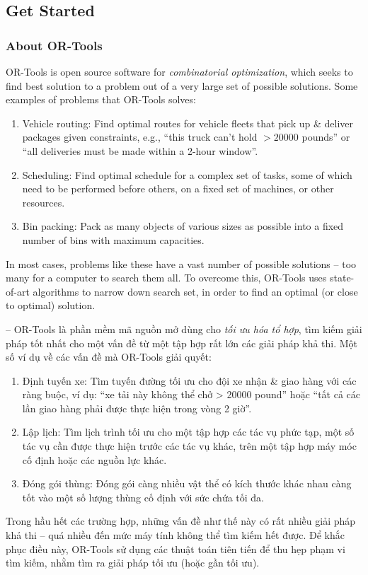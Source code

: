 \documentclass{article}
\begin{document}

\subsection{Get Started}


\subsubsection{About OR-Tools}
OR-Tools is open source software for {\it combinatorial optimization}, which seeks to find best solution to a problem out of a very large set of possible solutions. Some examples of problems that OR-Tools solves:
\begin{enumerate}
    \item Vehicle routing: Find optimal routes for vehicle fleets that pick up \& deliver packages given constraints, e.g., ``this truck can't hold $> 20000$ pounds'' or ``all deliveries must be made within a 2-hour window''.
    \item Scheduling: Find optimal schedule for a complex set of tasks, some of which need to be performed before others, on a fixed set of machines, or other resources.
    \item Bin packing: Pack as many objects of various sizes as possible into a fixed number of bins with maximum capacities.
\end{enumerate}
In most cases, problems like these have a vast number of possible solutions -- too many for a computer to search them all. To overcome this, OR-Tools uses state-of-art algorithms to narrow down search set, in order to find an optimal (or close to optimal) solution.

-- OR-Tools là phần mềm mã nguồn mở dùng cho {\it tối ưu hóa tổ hợp}, tìm kiếm giải pháp tốt nhất cho một vấn đề từ một tập hợp rất lớn các giải pháp khả thi. Một số ví dụ về các vấn đề mà OR-Tools giải quyết:
\begin{enumerate}
    \item Định tuyến xe: Tìm tuyến đường tối ưu cho đội xe nhận \& giao hàng với các ràng buộc, ví dụ: ``xe tải này không thể chở > 20000 pound'' hoặc ``tất cả các lần giao hàng phải được thực hiện trong vòng 2 giờ''.
    \item Lập lịch: Tìm lịch trình tối ưu cho một tập hợp các tác vụ phức tạp, một số tác vụ cần được thực hiện trước các tác vụ khác, trên một tập hợp máy móc cố định hoặc các nguồn lực khác.
    \item Đóng gói thùng: Đóng gói càng nhiều vật thể có kích thước khác nhau càng tốt vào một số lượng thùng cố định với sức chứa tối đa.
\end{enumerate}
Trong hầu hết các trường hợp, những vấn đề như thế này có rất nhiều giải pháp khả thi -- quá nhiều đến mức máy tính không thể tìm kiếm hết được. Để khắc phục điều này, OR-Tools sử dụng các thuật toán tiên tiến để thu hẹp phạm vi tìm kiếm, nhằm tìm ra giải pháp tối ưu (hoặc gần tối ưu).
\end{document}
